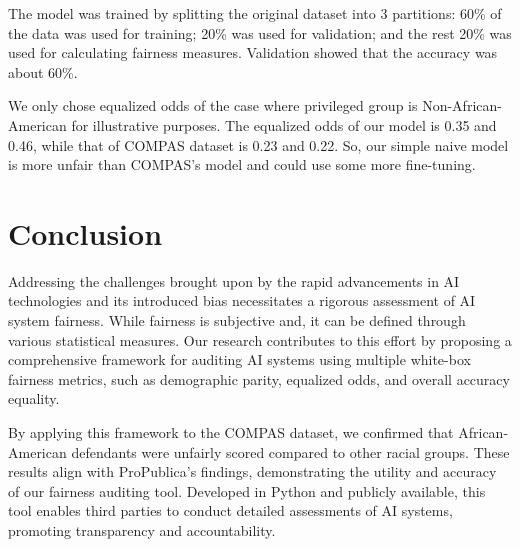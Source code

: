 \documentclass[conference]{IEEEtran}
\begin{document}
The model was trained by splitting the original dataset into 3 partitions: 60\% of the data was used for training; 20\% was used for validation; and the rest 20\% was used for calculating fairness measures. Validation showed that the accuracy was about 60\%.

We only chose equalized odds of the case where privileged group is Non-African-American for illustrative purposes. The equalized odds of our model is 0.35 and 0.46, while that of COMPAS dataset is 0.23 and 0.22. So, our simple naive model is more unfair than COMPAS's model and could use some more fine-tuning.

\section{Conclusion}
Addressing the challenges brought upon by the rapid advancements in AI technologies and its introduced bias necessitates a rigorous assessment of AI system fairness. While fairness is subjective and, it can be defined through various statistical measures. Our research contributes to this effort by proposing a comprehensive framework for auditing AI systems using multiple white-box fairness metrics, such as demographic parity, equalized odds, and overall accuracy equality.

By applying this framework to the COMPAS dataset, we confirmed that African-American defendants were unfairly scored compared to other racial groups. These results align with ProPublica's findings, demonstrating the utility and accuracy of our fairness auditing tool. Developed in Python and publicly available, this tool enables third parties to conduct detailed assessments of AI systems, promoting transparency and accountability.
\end{document}
